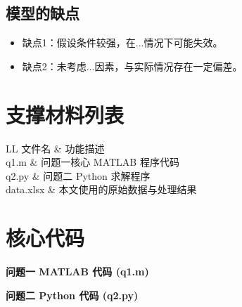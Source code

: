 \documentclass[withoutpreface,notoc]{cumcmthesis}
\begin{document}
	\subsection{模型的缺点}
	\begin{itemize}[itemindent=2em]
		\item 缺点1：假设条件较强，在...情况下可能失效。
		\item 缺点2：未考虑...因素，与实际情况存在一定偏差。
	\end{itemize}
	

	\newpage
	\begin{appendices}
		\section{支撑材料列表}
		\begin{table}[H]
			\centering
			\caption{附录文件列表}
			\label{tab:文件列表}
			\begin{tabularx}{\textwidth}{LL}
				\toprule
				文件名 & 功能描述 \\
				\midrule
				q1.m & 问题一核心 MATLAB 程序代码 \\
				q2.py & 问题二 Python 求解程序 \\
				data.xlsx & 本文使用的原始数据与处理结果 \\
				\bottomrule
			\end{tabularx}
		\end{table}
		
		\section{核心代码}
		\noindent\textbf{问题一 MATLAB 代码 (q1.m)}
		
		
		\noindent\textbf{问题二 Python 代码 (q2.py)}
		
		
	\end{appendices}
	
\end{document}
